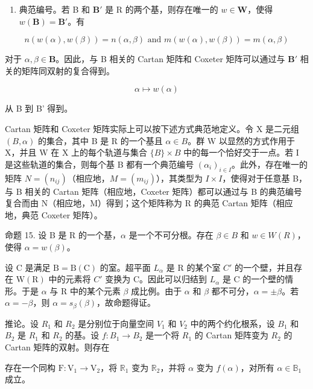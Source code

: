 \begin{enumerate}
\def\labelenumi{\arabic{enumi})}
\setcounter{enumi}{6}
\tightlist
\item
  典范编号。若 B 和 \(\mathbf{B}'\) 是 R 的两个基，则存在唯一的 \(w \in \mathbf{W}\)，使得 \(w(\mathbf{B}) = \mathbf{B}'\)。有
\end{enumerate}

\[
n (w (\alpha), w (\beta)) = n (\alpha , \beta) \text { and } m (w (\alpha), w (\beta)) = m (\alpha , \beta)
\]

对于 \(\alpha, \beta \in \mathbf{B}\)。因此，与 B 相关的 Cartan 矩阵和 Coxeter 矩阵可以通过与 \(\mathbf{B}'\) 相关的矩阵同双射的复合得到。

\[
\alpha \mapsto w (\alpha)
\]

从 B 到 B' 得到。

Cartan 矩阵和 Coxeter 矩阵实际上可以按下述方式典范地定义。令 X 是二元组 \((B, \alpha)\) 的集合，其中 B 是 R 的一个基且 \(\alpha \in B\)。群 W 以显然的方式作用于 X，并且 W 在 X 上的每个轨道与集合 \(\{B\} \times B\) 中的每一个恰好交于一点。若 I 是这些轨道的集合，则每个基 B 都有一个典范编号 \((\alpha_{i})_{i \in I}\)。此外，存在唯一的矩阵 \(N = (n_{ij})\)（相应地，\(M = (m_{ij})\)），其类型为 \(I \times I\)，使得对于任意基 B，与 B 相关的 Cartan 矩阵（相应地，Coxeter 矩阵）都可以通过与 B 的典范编号复合而由 N（相应地，M）得到；这个矩阵称为 R 的典范 Cartan 矩阵（相应地，典范 Coxeter 矩阵）。

命题 15. 设 B 是 R 的一个基，\(\alpha\) 是一个不可分根。存在 \(\beta \in B\) 和 \(w \in W(R)\)，使得 \(\alpha = w(\beta)\)。

设 C 是满足 \(\mathrm{B} = \mathrm{B}(\mathrm{C})\) 的室。超平面 \(L_{\alpha}\) 是 R 的某个室 \(C'\) 的一个壁，并且存在 \(\mathrm{W}(\mathrm{R})\) 中的元素将 \(C'\) 变换为 C。因此可以归结到 \(L_{\alpha}\) 是 C 的一个壁的情形。于是 \(\alpha\) 与 R 中的某个元素 \(\beta\) 成比例。由于 \(\alpha\) 和 \(\beta\) 都不可分，\(\alpha = \pm\beta\)。若 \(\alpha = -\beta\)，则 \(\alpha = s_{\beta}(\beta)\)，故命题得证。

推论。设 \(R_{1}\) 和 \(R_{2}\) 是分别位于向量空间 \(V_{1}\) 和 \(V_{2}\) 中的两个约化根系，设 \(B_{1}\) 和 \(B_{2}\) 是 \(R_{1}\) 和 \(R_{2}\) 的基。设 \(f: B_{1} \to B_{2}\) 是一个将 \(R_{1}\) 的 Cartan 矩阵变为 \(R_{2}\) 的 Cartan 矩阵的双射。则存在

存在一个同构 \(\mathrm{F}: \mathrm{V}_1 \to \mathrm{V}_2\)，将 \(\mathbb{R}_1\) 变为 \(\mathbb{R}_2\)，并将 \(\alpha\) 变为 \(f(\alpha)\)，对所有 \(\alpha \in \mathbb{B}_1\) 成立。

